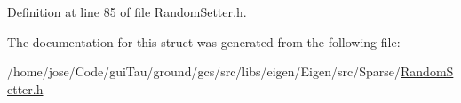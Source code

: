 Definition at line 85 of file Random\-Setter.\-h.



The documentation for this struct was generated from the following file\-:\begin{DoxyCompactItemize}
\item 
/home/jose/\-Code/gui\-Tau/ground/gcs/src/libs/eigen/\-Eigen/src/\-Sparse/\hyperlink{_random_setter_8h}{Random\-Setter.\-h}\end{DoxyCompactItemize}
